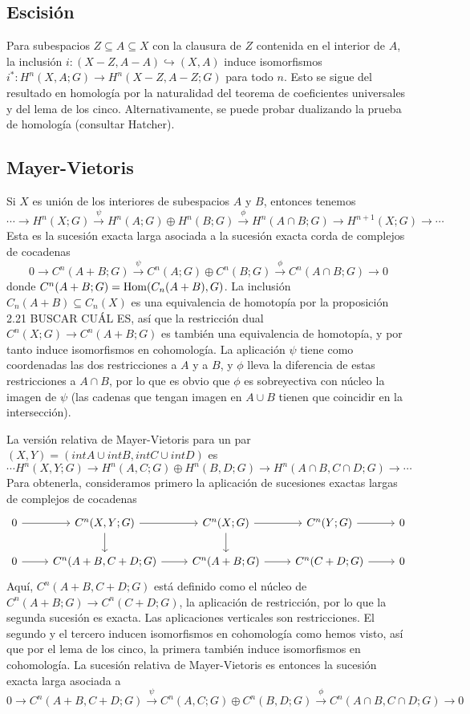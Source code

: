 \documentclass[TA.tex]{subfiles}
\begin{document}
\subsection{Escisión}
Para subespacios $Z\subseteq A\subseteq X$ con la clausura de $Z$ contenida en el interior de $A$, la inclusión $i:(X-Z,A-A)\hookrightarrow(X,A)$ induce isomorfismos $i^*:H^n(X,A;G)\to H^n(X-Z,A-Z;G)$ para todo $n$. Esto se sigue del resultado en homología por la naturalidad del teorema de coeficientes universales y del lema de los cinco. Alternativamente, se puede probar dualizando la prueba de homología (consultar Hatcher). 

\subsection{Mayer-Vietoris}
Si $X$ es unión de los interiores de subespacios $A$ y $B$, entonces tenemos
\[
\cdots\to H^n(X;G)\xrightarrow{\psi} H^n(A;G)\oplus H^n(B;G)\xrightarrow{\phi} H^n(A\cap B;G)\to H^{n+1}(X;G)\to\cdots
\]
Esta es la sucesión exacta larga asociada a la sucesión exacta corda de complejos de cocadenas
\[
0\to C^n(A+B;G)\xrightarrow{\psi}C^n(A;G)\oplus C^n(B;G)\xrightarrow{\phi} C^n(A\cap B;G)\to 0
\]
donde $C^n(A+B;G)=\operatorname{Hom}(C_n(A+B),G)$. La inclusión $C_n(A+B)\subseteq C_n(X)$ es una equivalencia de homotopía por la proposición 2.21 BUSCAR CUÁL ES, así que la restricción dual $C^n(X;G)\to C^n(A+B;G)$ es también una equivalencia de homotopía, y por tanto induce isomorfismos en cohomología. La aplicación $\psi$ tiene como coordenadas las dos restricciones a $A$ y a $B$, y $\phi$ lleva la diferencia de estas restricciones a $A\cap B$, por lo que es obvio que $\phi$ es sobreyectiva con núcleo la imagen de $\psi$ (las cadenas que tengan imagen en $A\cup B$ tienen que coincidir en la intersección). 

La versión relativa de Mayer-Vietoris para un par $(X,Y)=(int A\cup int B, int C\cup int D)$ es
\[
\cdots H^n(X,Y;G)\to H^n(A,C;G)\oplus H^n(B,D;G)\to H^n(A\cap B,C\cap D;G)\to\cdots
\]
Para obtenerla, consideramos primero la aplicación de sucesiones exactas largas de complejos de cocadenas
\[
\begin{tikzcd}
0\arrow[r] & C^n(X,Y;G)\arrow[r]\arrow[d] & C^n(X;G)\arrow[r]\arrow[d] & C^n(Y;G)\arrow[r] & 0\\
0\arrow[r] & C^n(A+B,C+D;G)\arrow[r] & C^n(A+B;G)\arrow[r] & C^n(C+D;G)\arrow[r] & 0
\end{tikzcd}
\]
Aquí, $C^n(A+B,C+D;G)$ está definido como el núcleo de $C^n(A+B;G)\to C^n(C+D;G)$, la aplicación de restricción, por lo que la segunda sucesión es exacta. Las aplicaciones verticales son restricciones. El segundo y el tercero inducen isomorfismos en cohomología como hemos visto, así que por el lema de los cinco, la primera también induce isomorfismos en cohomología. La sucesión relativa de Mayer-Vietoris es entonces la sucesión exacta larga asociada a
\[
0\to C^n(A+B,C+D;G)\xrightarrow{\psi} C^n(A,C;G)\oplus C^n(B,D;G)\xrightarrow{\phi} C^n(A\cap B, C\cap D;G)\to 0
\]
\end{document}
